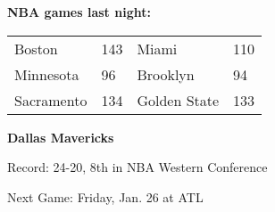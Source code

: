 \textbf{NBA games last night:
}\begin{tabular}{llll}
\toprule
    Boston & 143 &        Miami & 110 \\
 Minnesota &  96 &     Brooklyn &  94 \\
Sacramento & 134 & Golden State & 133 \\
\bottomrule
\end{tabular}

\textbf{Dallas Mavericks}

Record: 24-20, 8th in NBA Western Conference

Next Game: Friday, Jan. 26 at ATL
